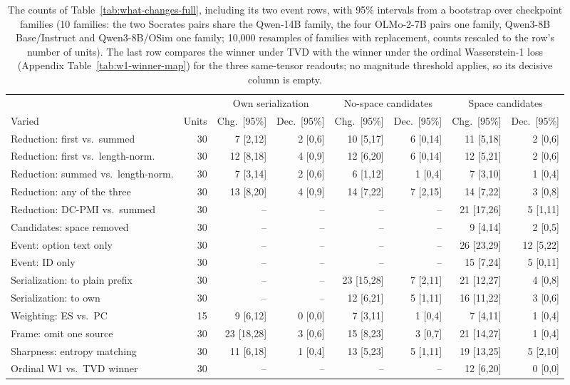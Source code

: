 \begin{table}[t]
\centering\scriptsize
\setlength{\tabcolsep}{4pt}
\begin{tabular}{@{}lrrrrrrr@{}}
\toprule
& & \multicolumn{2}{c}{Own serialization} & \multicolumn{2}{c}{No-space candidates} & \multicolumn{2}{c}{Space candidates} \\
\cmidrule(lr){3-4}\cmidrule(lr){5-6}\cmidrule(l){7-8}
Varied & Units & Chg.\ [95\%] & Dec.\ [95\%] & Chg.\ [95\%] & Dec.\ [95\%] & Chg.\ [95\%] & Dec.\ [95\%] \\
\midrule
Reduction: first vs.\ summed & 30 & 7 [2,12] & 2 [0,6] & 10 [5,17] & 6 [0,14] & 11 [5,18] & 2 [0,6] \\
Reduction: first vs.\ length-norm. & 30 & 12 [8,18] & 4 [0,9] & 12 [6,20] & 6 [0,14] & 12 [5,21] & 2 [0,6] \\
Reduction: summed vs.\ length-norm. & 30 & 7 [3,14] & 2 [0,6] & 6 [1,12] & 1 [0,4] & 7 [3,10] & 1 [0,4] \\
Reduction: any of the three & 30 & 13 [8,20] & 4 [0,9] & 14 [7,22] & 7 [2,15] & 14 [7,22] & 3 [0,8] \\
Reduction: DC-PMI vs.\ summed & 30 & -- & -- & -- & -- & 21 [17,26] & 5 [1,11] \\
Candidates: space removed & 30 & -- & -- & -- & -- & 9 [4,14] & 2 [0,5] \\
Event: option text only & 30 & -- & -- & -- & -- & 26 [23,29] & 12 [5,22] \\
Event: ID only & 30 & -- & -- & -- & -- & 15 [7,24] & 5 [0,11] \\
Serialization: to plain prefix & 30 & -- & -- & 23 [15,28] & 7 [2,11] & 21 [12,27] & 4 [0,8] \\
Serialization: to own & 30 & -- & -- & 12 [6,21] & 5 [1,11] & 16 [11,22] & 3 [0,6] \\
Weighting: ES vs.\ PC & 15 & 9 [6,12] & 0 [0,0] & 7 [3,11] & 1 [0,4] & 7 [4,11] & 1 [0,4] \\
Frame: omit one source & 30 & 23 [18,28] & 3 [0,6] & 15 [8,23] & 3 [0,7] & 21 [14,27] & 1 [0,4] \\
Sharpness: entropy matching & 30 & 11 [6,18] & 1 [0,4] & 13 [5,23] & 5 [1,11] & 19 [13,25] & 5 [2,10] \\
Ordinal W1 vs.\ TVD winner & 30 & -- & -- & -- & -- & 12 [6,20] & 0 [0,0] \\
\bottomrule
\end{tabular}
\caption{The counts of Table~\ref{tab:what-changes-full}, including its two event rows, with 95\% intervals from a bootstrap over checkpoint families (10 families: the two Socrates pairs share the Qwen-14B family, the four OLMo-2-7B pairs one family, Qwen3-8B Base/Instruct and Qwen3-8B/OSim one family; 10,000 resamples of families with replacement, counts rescaled to the row's number of units). The last row compares the winner under TVD with the winner under the ordinal Wasserstein-1 loss (Appendix Table~\ref{tab:w1-winner-map}) for the three same-tensor readouts; no magnitude threshold applies, so its decisive column is empty.}
\label{tab:family-boot}
\end{table}
